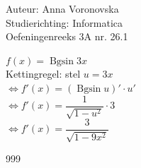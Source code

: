 \documentclass[a4paper]{article}
\begin{document}
  
\noindent \large Auteur: Anna Voronovska \\
\noindent \large Studierichting: Informatica\\
\noindent \large Oefeningenreeks 3A nr. 26.1\\

\medskip

\normalsize

$f(x) = \operatorname{Bgsin} 3x$ \\

Kettingregel: stel $u = 3x$ \\

$\Leftrightarrow f'(x) = (\operatorname{Bgsin} u)' \cdot u'$ \\

$\Leftrightarrow f'(x) = \dfrac{1}{\sqrt{1-u^2}} \cdot 3$ \\

$\Leftrightarrow f'(x) = \dfrac{3}{\sqrt{1-9x^2}}$



\begin{thebibliography}{999}
\end{thebibliography}
\end{document}
